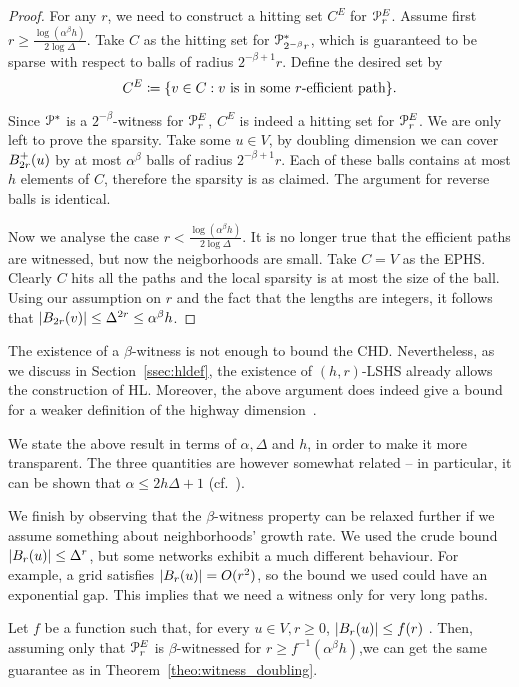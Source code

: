 \begin{proof}
For any $r$, we need to construct a hitting set $C^E$ for $\mathcal{P}^E_r$.
Assume first $r\geq \frac{\log(\alpha^\beta h)}{2\log\Delta}$.
Take $C$ as the hitting set for $\mathcal{P}^*_{2^{-\beta}r}$, which is guaranteed to be sparse with respect to balls of radius $2^{-\beta+1}r$.
Define the desired set by
\[
C^E\coloneqq\{v\in C: v \text{ is in some $r$-efficient path} \}.
\]

Since $\mathcal{P}^*$ is a $2^{-\beta}$-witness for $\mathcal{P}^E_r$, $C^E$ is indeed a hitting set for $\mathcal{P}^E_r$.
We are only left to prove the sparsity.
Take some $u\in V$, by doubling dimension we can cover $B^+_{2r}(u)$ by at most $\alpha^\beta$ balls of radius $2^{-\beta+1}r$.
Each of these balls contains at most $h$ elements of $C$, therefore the sparsity is as claimed.
The argument for reverse balls is identical.

Now we analyse the case $r< \frac{\log(\alpha^\beta h)}{2\log\Delta}$.
It is no longer true that the efficient paths are witnessed, but now the neigborhoods are small.
Take $C=V$ as the EPHS.
Clearly $C$ hits all the paths and the local sparsity is at most the size of the ball.
Using our assumption on $r$ and the fact that the lengths are integers, it follows that $\lvert B_{2r}(v)\rvert\leq\Delta^{2r}\leq\alpha^\beta h$. 
\end{proof}
\begin{remark}
The existence of a $\beta$-witness is not enough to bound the CHD. Nevertheless, as we discuss in Section~\ref{ssec:hldef}, the existence of $(h,r)$-LSHS already allows the construction of HL. Moreover, the above argument does indeed give a bound for a weaker definition of the highway dimension~\cite{highway2010}.
\end{remark}
\begin{remark}
We state the above result in terms of $\alpha, \Delta$ and $h$, in order to make it more transparent. The three quantities are however somewhat related -- in particular, it can be shown that $\alpha\leq 2h\Delta+1$ (cf.~\cite{skeleton}).
\end{remark}

We finish by observing that the $\beta$-witness property can be relaxed further if we assume something about neighborhoods' growth rate.
We used the crude bound $\lvert B_r(u)\rvert\leq \Delta^r$, but some networks exhibit a much different behaviour.
For example, a grid satisfies  $\lvert B_r(u)\rvert=O(r^2)$, so the bound we used could have an exponential gap.
This implies that we need a witness only for very long paths.

\begin{corollary}
Let $f$ be a function such that, for every $u\in V, r\geq 0$, $\lvert B_r(u)\rvert\leq f(r)$ .
Then, assuming only that $\mathcal{P}^E_r$ is $\beta$-witnessed for $r\geq f^{-1}(\alpha^\beta h)$,we can get the same guarantee as in Theorem~\ref{theo:witness_doubling}.
\end{corollary}